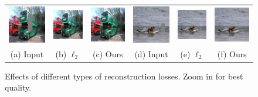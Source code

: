\begin{figure}[h!]  
\centering  
\small  
\setlength\tabcolsep{1pt}
\begin{tabular}{cccccc} 
\includegraphics[width=.17\textwidth]{figures/loss/000000090208_input_image.jpg}& 
\includegraphics[width=.17\textwidth]{figures/loss/000000090208_synthesized_image.jpg}& 
\includegraphics[width=.17\textwidth]{figures/loss/000000090208_synthesized_image.png}& 
\includegraphics[width=.17\textwidth]{figures/loss/000000490171_input_image.jpg}& 
\includegraphics[width=.17\textwidth]{figures/loss/000000490171_synthesized_image.jpg}& 
\includegraphics[width=.17\textwidth]{figures/loss/000000490171_synthesized_image.png}\\
(a) Input & (b) $\ell_2$ & (c) Ours & (d) Input & (e) $\ell_2$ & (f) Ours\\ 
\end{tabular} 
\caption{Effects of different types of reconstruction losses. Zoom in for best quality.}
\label{fig:ppl} 
\end{figure}  


